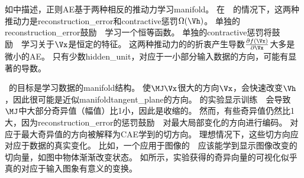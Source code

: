 如中描述，正则\gls{AE}基于两种相反的推动力学习\gls{manifold}。
在~~的情况下，这两种推动力是\gls{reconstruction_error}和\gls{contractive}惩罚$\Omega(\Vh)$。
单独的\gls{reconstruction_error}鼓励~~学习一个恒等函数。
单独的\gls{contractive}惩罚将鼓励~~学习关于$\Vx$是恒定的特征。
这两种推动力的的折衷产生导数$\frac{\partial f(\Vx)}{\partial \Vx}$大多是微小的\gls{AE}。
只有少数\gls{hidden_unit}，对应于一小部分输入数据的方向，可能有显著的导数。


~的目标是学习数据的\gls{manifold}结构。
使$\MJ\Vx$很大的方向$\Vx$，会快速改变$\Vh$，因此很可能是近似\gls{manifold}\gls{tangent_plane}的方向。
\citet{Rifai+al-2011-small,Salah+al-2011-small}的实验显示训练~~会导致$\MJ$中大部分奇异值（幅值）比1小，因此是收缩的。
然而，有些奇异值仍然比1大，因为\gls{reconstruction_error}的惩罚鼓励~~对最大局部变化的方向进行编码。
对应于最大奇异值的方向被解释为\gls{CAE}学到的切方向。
理想情况下，这些切方向应对应于数据的真实变化。
比如，一个应用于图像的~~应该能学到显示图像改变的切向量，如图中物体渐渐改变状态。
如所示，实验获得的奇异向量的可视化似乎真的对应于输入图象有意义的变换。


